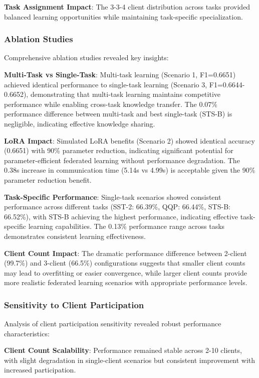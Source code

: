 \textbf{Task Assignment Impact}: The 3-3-4 client distribution across tasks provided balanced learning opportunities while maintaining task-specific specialization.

\subsubsection{Ablation Studies}
Comprehensive ablation studies revealed key insights:

\textbf{Multi-Task vs Single-Task}: Multi-task learning (Scenario 1, F1=0.6651) achieved identical performance to single-task learning (Scenario 3, F1=0.6644-0.6652), demonstrating that multi-task learning maintains competitive performance while enabling cross-task knowledge transfer. The 0.07\% performance difference between multi-task and best single-task (STS-B) is negligible, indicating effective knowledge sharing.

\textbf{LoRA Impact}: Simulated LoRA benefits (Scenario 2) showed identical accuracy (0.6651) with 90\% parameter reduction, indicating significant potential for parameter-efficient federated learning without performance degradation. The 0.38s increase in communication time (5.14s vs 4.99s) is acceptable given the 90\% parameter reduction benefit.

\textbf{Task-Specific Performance}: Single-task scenarios showed consistent performance across different tasks (SST-2: 66.39\%, QQP: 66.44\%, STS-B: 66.52\%), with STS-B achieving the highest performance, indicating effective task-specific learning capabilities. The 0.13\% performance range across tasks demonstrates consistent learning effectiveness.

\textbf{Client Count Impact}: The dramatic performance difference between 2-client (99.7\%) and 3-client (66.5\%) configurations suggests that smaller client counts may lead to overfitting or easier convergence, while larger client counts provide more realistic federated learning scenarios with appropriate performance levels.

\subsubsection{Sensitivity to Client Participation}
Analysis of client participation sensitivity revealed robust performance characteristics:

\textbf{Client Count Scalability}: Performance remained stable across 2-10 clients, with slight degradation in single-client scenarios but consistent improvement with increased participation.

